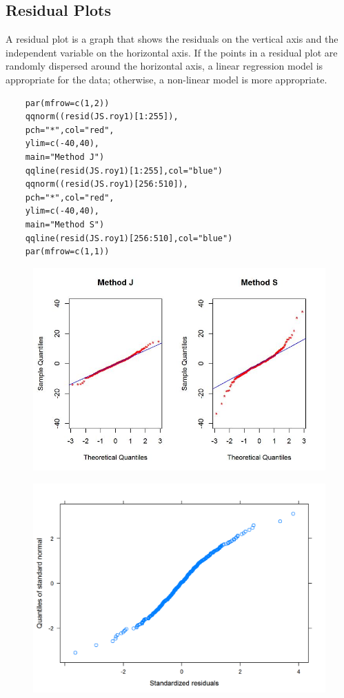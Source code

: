 \documentclass[Main.tex]{subfiles}
\begin{document}
\newpage


\subsection{Residual Plots}
A residual plot is a graph that shows the residuals on the vertical axis and the independent variable on the horizontal axis. If the points in a residual plot are randomly dispersed around the horizontal axis, a linear regression model is appropriate for the data; otherwise, a non-linear model is more appropriate.

\begin{framed}
	\begin{verbatim}
	par(mfrow=c(1,2))
	qqnorm((resid(JS.roy1)[1:255]),
	pch="*",col="red",
	ylim=c(-40,40),
	main="Method J")
	qqline(resid(JS.roy1)[1:255],col="blue")
	qqnorm((resid(JS.roy1)[256:510]),
	pch="*",col="red",
	ylim=c(-40,40),
	main="Method S")
	qqline(resid(JS.roy1)[256:510],col="blue")
	par(mfrow=c(1,1))
	\end{verbatim}	
\end{framed}


\begin{figure}[h!]
	\centering
	\includegraphics[width=1.1\linewidth]{images/Resid-newplot2}
	\caption{}
	\label{fig:Resid-newplot2}
\end{figure}


\begin{figure}[h!]
	\centering
	\includegraphics[width=0.9\linewidth]{images/ResidPlot3}
	\label{fig:ResidPlot3}
\end{figure}
\end{document}
